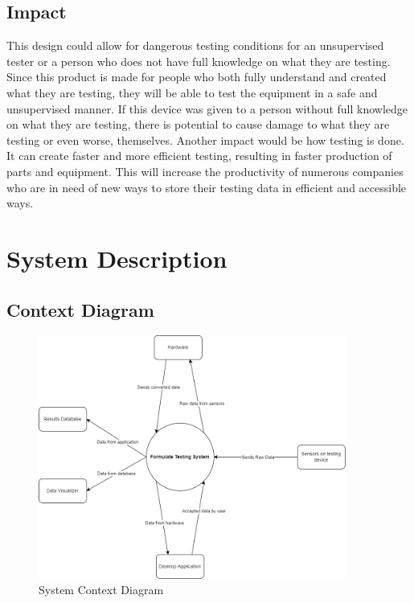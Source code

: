 \documentclass[12pt]{article}
\begin{document}
\newpage

\subsection{Impact}
This design could allow for dangerous testing conditions for an unsupervised tester or a person who does not have full knowledge on what they are testing. Since this product is made for people who both fully understand and created what they are testing, they will be able to test the equipment in a safe and unsupervised manner. If this device was given to a person without full knowledge on what they are testing, there is potential to cause damage to what they are testing or even worse, themselves. Another impact would be how testing is done. It can create faster and more efficient testing, resulting in faster production of parts and equipment. This will increase the productivity of numerous companies who are in need of new ways to store their testing data in efficient and accessible ways.

\newpage

\section{System Description}

\subsection{Context Diagram}
\begin{figure}[h!]
\begin{center}
\includegraphics[width=0.9\textwidth]{sys_context_diagram}
\caption{System Context Diagram}
\label{Fig_SystemContext} 
\end{center}
\end{figure}
\newpage
\end{document}
